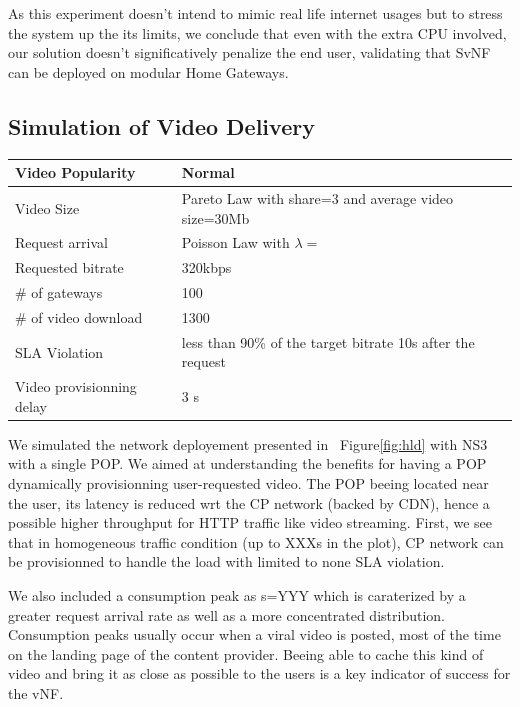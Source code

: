 As this experiment doesn't intend to mimic real life internet usages but to stress the system up the its limits, we conclude that even with the extra CPU involved, our solution doesn't significatively penalize the end user, validating that SvNF can be deployed on modular Home Gateways.

\subsection{Simulation of Video Delivery} \label{videodelivery}
\begin{table}
	\begin{tabular}{| p{} | p{} |}
	\hline
		Video Popularity & Normal \\\hline
		Video Size&Pareto Law with share=3 and average video size=30Mb\\\hline
		Request arrival & Poisson Law with $\lambda=${}\\\hline
		Requested bitrate & 320kbps\\\hline
		\# of gateways & 100\\\hline
		\# of video download & 1300\\\hline
		SLA Violation & less than 90\% of the target bitrate 10s after the request\\\hline
		Video provisionning delay & 3 s\\\hline
		
		
	\end{tabular}
\end{table}
We simulated the network deployement presented in ~Figure\ref{fig:hld} with NS3 with a single POP.
We aimed at understanding the benefits for having a POP dynamically provisionning user-requested video. 
The POP beeing located near the user, its latency is reduced wrt the CP network (backed by CDN), hence a possible higher throughput for HTTP traffic like video streaming.
First, we see that in homogeneous traffic condition (up to XXXs in the plot), CP network can be provisionned to handle the load with limited to none SLA violation. 

We also included a consumption peak as s=YYY which is caraterized by a greater request arrival rate as well as a more concentrated distribution.
Consumption peaks usually occur when a viral video is posted, most of the time on the landing page of the content provider. Beeing able to cache this kind of video and bring it as close as possible to the users is a key indicator of success for the vNF.




